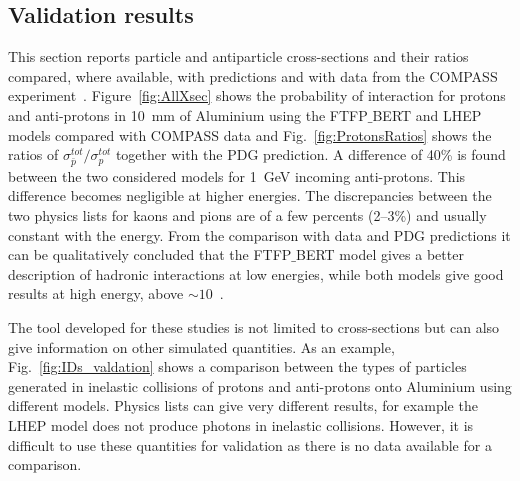 \subsection{Validation results}

This section reports particle and antiparticle cross-sections and their ratios
compared, where available, with predictions and with data from the COMPASS experiment~\cite{Abbon:2007pq}.
%
Figure~\ref{fig:AllXsec} shows the probability of interaction for protons and anti-protons in 10~mm of Aluminium
using the FTFP$\_$BERT and LHEP models compared with COMPASS data
and Fig.~\ref{fig:ProtonsRatios} shows the ratios of $\sigma^{tot}_{\bar{p}} / \sigma^{tot}_{p}$
together with the PDG prediction. 
%
A difference of 40\% is found between the two considered models for 1~GeV incoming anti-protons.
This difference becomes negligible at higher energies. The discrepancies between the two physics lists
for kaons and pions are of a few percents (2--3\%) and usually constant with the energy. From the comparison 
with data and PDG predictions it can be qualitatively concluded that the FTFP$\_$BERT model gives a better
description of hadronic interactions at low energies, while both models give good results at high energy, above $\sim10$~\gev.

The tool developed for these studies is not limited to cross-sections but can also give information on other simulated quantities.
As an example, Fig.~\ref{fig:IDs_valdation} shows a comparison between the types of particles generated in inelastic
collisions of protons and anti-protons onto Aluminium using different models. Physics lists can give very different results, 
for example the LHEP model does not produce photons in inelastic collisions. However, it is difficult to use these
quantities for validation as there is no data available for a comparison.


